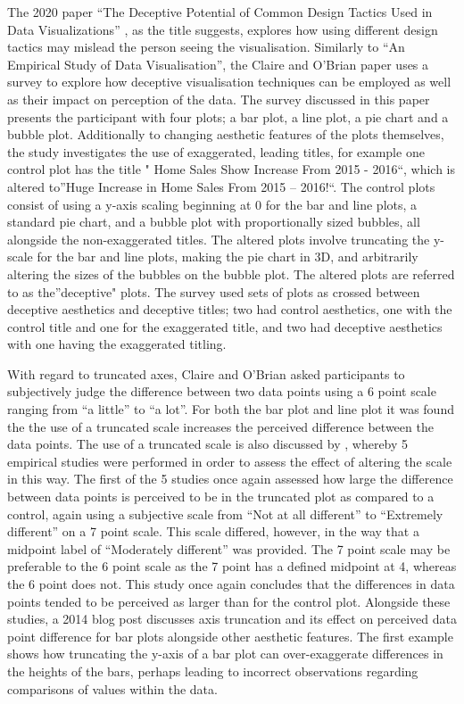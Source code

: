 \documentclass[
  12pt,
]{book}
\begin{document}
The 2020 paper ``The Deceptive Potential of Common Design Tactics Used
in Data Visualizations'' \citep{claire-obrian}, as the title suggests,
explores how using different design tactics may mislead the person
seeing the visualisation. Similarly to ``An Empirical Study of Data
Visualisation'', the Claire and O'Brian paper uses a survey to explore
how deceptive visualisation techniques can be employed as well as their
impact on perception of the data. The survey discussed in this paper
presents the participant with four plots; a bar plot, a line plot, a pie
chart and a bubble plot. Additionally to changing aesthetic features of
the plots themselves, the study investigates the use of exaggerated,
leading titles, for example one control plot has the title " Home Sales
Show Increase From 2015 - 2016``, which is altered to''Huge Increase in
Home Sales From 2015 -- 2016!``. The control plots consist of using a
y-axis scaling beginning at 0 for the bar and line plots, a standard pie
chart, and a bubble plot with proportionally sized bubbles, all
alongside the non-exaggerated titles. The altered plots involve
truncating the y-scale for the bar and line plots, making the pie chart
in 3D, and arbitrarily altering the sizes of the bubbles on the bubble
plot. The altered plots are referred to as the''deceptive" plots. The
survey used sets of plots as crossed between deceptive aesthetics and
deceptive titles; two had control aesthetics, one with the control title
and one for the exaggerated title, and two had deceptive aesthetics with
one having the exaggerated titling.

With regard to truncated axes, Claire and O'Brian asked participants to
subjectively judge the difference between two data points using a 6
point scale ranging from ``a little'' to ``a lot''. For both the bar
plot and line plot it was found the the use of a truncated scale
increases the perceived difference between the data points. The use of a
truncated scale is also discussed by \citet{YANG2021}, whereby 5
empirical studies were performed in order to assess the effect of
altering the scale in this way. The first of the 5 studies once again
assessed how large the difference between data points is perceived to be
in the truncated plot as compared to a control, again using a subjective
scale from ``Not at all different'' to ``Extremely different'' on a 7
point scale. This scale differed, however, in the way that a midpoint
label of ``Moderately different'' was provided. The 7 point scale may be
preferable to the 6 point scale as the 7 point has a defined midpoint at
4, whereas the 6 point does not. This study once again concludes that
the differences in data points tended to be perceived as larger than for
the control plot. Alongside these studies, a 2014 blog post
\citep{parikh_2014} discusses axis truncation and its effect on
perceived data point difference for bar plots alongside other aesthetic
features. The first example shows how truncating the y-axis of a bar
plot can over-exaggerate differences in the heights of the bars, perhaps
leading to incorrect observations regarding comparisons of values within
the data.
\end{document}
